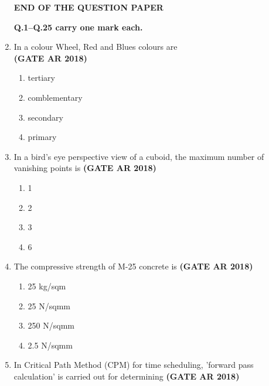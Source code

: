 \documentclass[journal,15pt,onecolumn]{IEEEtran}
\theoremstyle{remark}
\begin{document}
\begin{enumerate}
\begin{center}
    \textbf{END OF THE QUESTION PAPER}
\end{center}


\vspace{0.6cm}
\textbf{Q.1--Q.25 carry one mark each.}

\vspace{0.5cm}
\item 
In a colour  Wheel, Red and Blues colours are \\\hfill \textbf{ (GATE AR 2018)}
 
\begin{enumerate}
\item    tertiary
\item    comblementary
\item    secondary
\item    primary
\end{enumerate} 


\item 
In a bird's eye perspective view of a cuboid, the maximum number of vanishing points is\hfill \textbf{ (GATE AR 2018)}

\vspace{0.5em}

\begin{enumerate}
\item    1 
\item    2
\item    3 
\item    6
\end{enumerate}

\vspace{1.5em}

\item 
The compressive strength of M-25 concrete is\hfill \textbf{ (GATE AR 2018)}

\vspace{0.5em}

\begin{enumerate}
\item  25 kg/sqm
\item  25 N/sqmm 
\item 250 N/sqmm 
\item 2.5 N/sqmm
\end{enumerate}

\vspace{1.5em}

\item 
In Critical Path Method (CPM) for time scheduling, 'forward pass calculation' is carried out for determining\hfill \textbf{ (GATE AR 2018)}


\end{enumerate}
\end{document}
